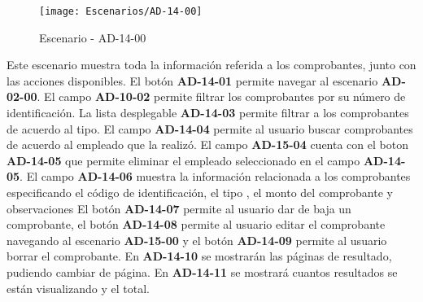 \begin{figure}[H]
\centering
\texttt{[image: Escenarios/AD-14-00]}
\caption{Escenario - AD-14-00}
\label{fig:AD-14-00}
\end{figure}
Este escenario muestra toda la información referida a los comprobantes, junto con las acciones disponibles.
El botón \textbf{AD-14-01} permite navegar al escenario \textbf{AD-02-00}. El campo \textbf{AD-10-02} permite filtrar los comprobantes por su número de identificación. La lista desplegable \textbf{AD-14-03} permite filtrar a los comprobantes de acuerdo al tipo. El campo \textbf{AD-14-04} permite al usuario buscar comprobantes de acuerdo al empleado que la realizó. El campo \textbf{AD-15-04} cuenta con el boton \textbf{AD-14-05} que permite eliminar el empleado seleccionado en el campo \textbf{AD-14-05}.
El campo \textbf{AD-14-06} muestra la información relacionada a los comprobantes especificando el código de identificación, el tipo , el monto del comprobante y observaciones El botón \textbf{AD-14-07} permite al usuario dar de baja un comprobante, el botón \textbf{AD-14-08} permite al usuario editar el comprobante navegando al escenario \textbf{AD-15-00} y el botón \textbf{AD-14-09} permite al usuario borrar el comprobante. 
En  \textbf{AD-14-10} se mostrarán las páginas de resultado, pudiendo cambiar de página. En \textbf{AD-14-11} se mostrará cuantos resultados se están visualizando y el total.
\\